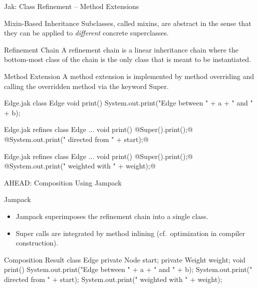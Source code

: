 \begin{frame}[fragile]{Jak: Class Refinement – Method Extensions}
	\vspace{-1.5cm}\begin{flushright}\end{flushright}
	\begin{mycolumns}[widths={50,50},animation=none]
		\begin{definition}{Mixin-Based Inheritance}
			Subclasses, called mixins, are abstract in the sense that they can be applied to \emph{different} concrete superclasses.
		\end{definition}
		\begin{definition}{Refinement Chain}
			A refinement chain is a linear inheritance chain where the bottom-most class of the chain is the only class that is meant to be instantiated.
		\end{definition}
		\begin{definition}{Method Extension}
			A method extension is implemented by method overriding and calling the overridden method via the keyword Super.
		\end{definition}
	\mynextcolumn
{
\begin{codetight}[basicstyle=\tiny]{Edge.jak}
class Edge {
	void print() {
		System.out.print("Edge between " + a + " and " + b);
	}
}
\end{codetight}
\begin{codetight}[basicstyle=\tiny]{Edge.jak}
refines class Edge {
	...
	void print() {
		@Super().print();@
		@System.out.print(" directed from " + start);@
	}
}
\end{codetight}
\begin{codetight}[basicstyle=\tiny]{Edge.jak}
refines class Edge {
	...
	void print() {
		@Super().print();@
		@System.out.print(" weighted with " + weight);@
	}
}
\end{codetight}
}
	\end{mycolumns}
\end{frame}

\begin{frame}[fragile]{AHEAD: Composition Using Jampack}
	\begin{mycolumns}[widths={35,65},animation=none]
		\begin{definition}{Jampack}
			\begin{itemize}
				\item Jampack superimposes the refinement chain into a single class.
				\item Super calls are integrated by method inlining (cf.\ optimization in compiler construction).
			\end{itemize}
		\end{definition}
	\mynextcolumn
\begin{codetight}{Composition Result}
class Edge {
	private Node start;
	private Weight weight;
	void print() {
		System.out.print("Edge between " + a + " and " + b);
		System.out.print(" directed from " + start);
		System.out.print(" weighted with " + weight);
	}
}
\end{codetight}
	\end{mycolumns}
\end{frame}

